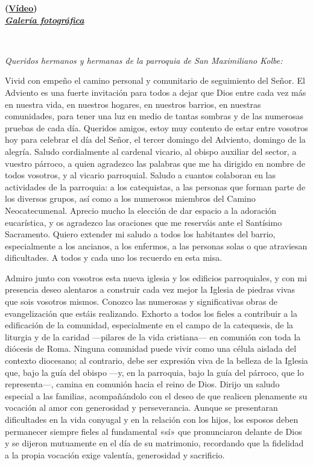 \textbf{(\protect\hyperlink{}{Vídeo})\\
}\textspanish{
	\emph{\textbf{\href{http://www.vatican.va/news_services/liturgy/photogallery/2010/20101212/index.html}{Galería
				fotográfica}}}}

~

\emph{Queridos hermanos y hermanas de la parroquia de San Maximiliano
	Kolbe:}

Vivid con empeño el camino personal y comunitario de seguimiento del
Señor. El Adviento es una fuerte invitación para todos a dejar que Dios
entre cada vez más en nuestra vida, en nuestros hogares, en nuestros
barrios, en nuestras comunidades, para tener una luz en medio de tantas
sombras y de las numerosas pruebas de cada día. Queridos amigos, estoy
muy contento de estar entre vosotros hoy para celebrar el día del Señor,
el tercer domingo del Adviento, domingo de la alegría. Saludo
cordialmente al cardenal vicario, al obispo auxiliar del sector, a
vuestro párroco, a quien agradezco las palabras que me ha dirigido en
nombre de todos vosotros, y al vicario parroquial. Saludo a cuantos
colaboran en las actividades de la parroquia: a los catequistas, a las
personas que forman parte de los diversos grupos, así como a los
numerosos miembros del Camino Neocatecumenal. Aprecio mucho la elección
de dar espacio a la adoración eucarística, y os agradezco las oraciones
que me reserváis ante el Santísimo Sacramento. Quiero extender mi saludo
a todos los habitantes del barrio, especialmente a los ancianos, a los
enfermos, a las personas solas o que atraviesan dificultades. A todos y
cada uno los recuerdo en esta misa.

Admiro junto con vosotros esta nueva iglesia y los edificios
parroquiales, y con mi presencia deseo alentaros a construir cada vez
mejor la Iglesia de piedras vivas que sois vosotros mismos. Conozco las
numerosas y significativas obras de evangelización que estáis
realizando. Exhorto a todos los fieles a contribuir a la edificación de
la comunidad, especialmente en el campo de la catequesis, de la liturgia
y de la caridad ---pilares de la vida cristiana--- en comunión con toda
la diócesis de Roma. Ninguna comunidad puede vivir como una célula
aislada del contexto diocesano; al contrario, debe ser expresión viva de
la belleza de la Iglesia que, bajo la guía del obispo ---y, en la
parroquia, bajo la guía del párroco, que lo representa---, camina en
comunión hacia el reino de Dios. Dirijo un saludo especial a las
familias, acompañándolo con el deseo de que realicen plenamente su
vocación al amor con generosidad y perseverancia. Aunque se presentaran
dificultades en la vida conyugal y en la relación con los hijos, los
esposos deben permanecer siempre fieles al fundamental «sí» que
pronunciaron delante de Dios y se dijeron mutuamente en el día de su
matrimonio, recordando que la fidelidad a la propia vocación exige
valentía, generosidad y sacrificio.

